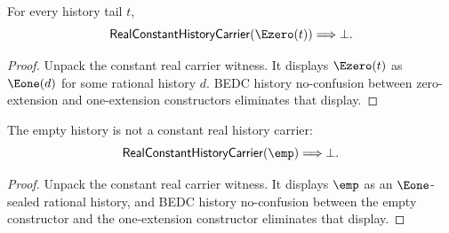 \begin{theorem}
\label{thm:real-constant-history-carrier-e0-absurd}
For every history tail $t$,
$$
\mathsf{RealConstantHistoryCarrier}(\Ezero(t))
\Longrightarrow
\bot.
$$
\end{theorem}
\begin{proof}
Unpack the constant real carrier witness. It displays $\Ezero(t)$ as
$\Eone(d)$ for some rational history $d$. BEDC history no-confusion between
zero-extension and one-extension constructors eliminates that display.
\end{proof}

\begin{theorem}
\label{thm:real-constant-history-carrier-empty-absurd}
The empty history is not a constant real history carrier:
$$
\mathsf{RealConstantHistoryCarrier}(\emp)
\Longrightarrow
\bot.
$$
\end{theorem}
\begin{proof}
Unpack the constant real carrier witness. It displays $\emp$ as an
$\Eone$-sealed rational history, and BEDC history no-confusion between the
empty constructor and the one-extension constructor eliminates that display.
\end{proof}

